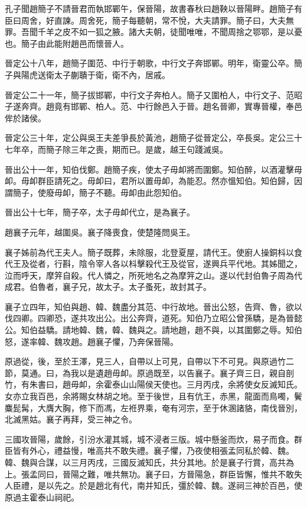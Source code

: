 孔子聞趙簡子不請晉君而執邯鄲午，保晉陽，故書春秋曰趙鞅以晉陽畔。趙簡子有臣曰周舍，好直諫。周舍死，簡子每聽朝，常不悅，大夫請罪。簡子曰，大夫無罪。吾聞千羊之皮不如一狐之腋。諸大夫朝，徒聞唯唯，不聞周捨之鄂鄂，是以憂也。簡子由此能附趙邑而懷晉人。

晉定公十八年，趙簡子圍范、中行于朝歌，中行文子奔邯鄲。明年，衛靈公卒。簡子與陽虎送衛太子蒯聵于衛，衛不內，居戚。

晉定公二十一年，簡子拔邯鄲，中行文子奔柏人。簡子又圍柏人，中行文子、范昭子遂奔齊。趙竟有邯鄲、柏人。范、中行餘邑入于晉。趙名晉卿，實專晉權，奉邑侔於諸侯。

晉定公三十年，定公與吳王夫差爭長於黃池，趙簡子從晉定公，卒長吳。定公三十七年卒，而簡子除三年之喪，期而已。是歲，越王句踐滅吳。

晉出公十一年，知伯伐鄭。趙簡子疾，使太子毋卹將而圍鄭。知伯醉，以酒灌擊毋卹。毋卹群臣請死之。毋卹曰，君所以置毋卹，為能忍。然亦慍知伯。知伯歸，因謂簡子，使廢毋卹，簡子不聽。毋卹由此怨知伯。

晉出公十七年，簡子卒，太子毋卹代立，是為襄子。

趙襄子元年，越圍吳。襄子降喪食，使楚隆問吳王。

襄子姊前為代王夫人。簡子既葬，未除服，北登夏屋，請代王。使廚人操銅枓以食代王及從者，行斟，陰令宰人各以枓擊殺代王及從官，遂興兵平代地。其姊聞之，泣而呼天，摩笄自殺。代人憐之，所死地名之為摩笄之山。遂以代封伯魯子周為代成君。伯魯者，襄子兄，故太子。太子蚤死，故封其子。

襄子立四年，知伯與趙、韓、魏盡分其范、中行故地。晉出公怒，告齊、魯，欲以伐四卿。四卿恐，遂共攻出公。出公奔齊，道死。知伯乃立昭公曾孫驕，是為晉懿公。知伯益驕。請地韓、魏，韓、魏與之。請地趙，趙不與，以其圍鄭之辱。知伯怒，遂率韓、魏攻趙。趙襄子懼，乃奔保晉陽。

原過從，後，至於王澤，見三人，自帶以上可見，自帶以下不可見。與原過竹二節，莫通。曰，為我以是遺趙毋卹。原過既至，以告襄子。襄子齊三日，親自剖竹，有朱書曰，趙毋卹，余霍泰山山陽侯天使也。三月丙戌，余將使女反滅知氏。女亦立我百邑，余將賜女林胡之地。至于後世，且有伉王，赤黑，龍面而鳥噣，鬢麋髭髯，大膺大胸，修下而馮，左袵界乘，奄有河宗，至于休溷諸貉，南伐晉別，北滅黑姑。襄子再拜，受三神之令。

三國攻晉陽，歲餘，引汾水灌其城，城不浸者三版。城中懸釜而炊，易子而食。群臣皆有外心，禮益慢，唯高共不敢失禮。襄子懼，乃夜使相張孟同私於韓、魏。韓、魏與合謀，以三月丙戌，三國反滅知氏，共分其地。於是襄子行賞，高共為上。張孟同曰，晉陽之難，唯共無功。襄子曰，方晉陽急，群臣皆懈，惟共不敢失人臣禮，是以先之。於是趙北有代，南并知氏，彊於韓、魏。遂祠三神於百邑，使原過主霍泰山祠祀。

